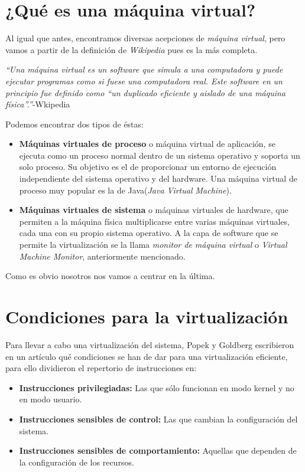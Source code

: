 \section{¿Qué es una máquina virtual?}

\noindent Al igual que antes, encontramos diversas acepciones de \emph{máquina virtual}, pero vamos a partir de la definición de \emph{Wikipedia} pues es la más completa.

\begin{center}
\emph{\textquotedblleft Una máquina virtual es un software que simula a una computadora y puede ejecutar programas como si fuese una computadora real. Este software en un principio fue definido como \textquotedblleft un duplicado eficiente y aislado de una máquina física\textquotedblright.\textquotedblright}-Wkipedia\cite{defmaqvirwiki}
\end{center}

\noindent Podemos encontrar dos tipos de éstas:

\begin{itemize}
\item \textbf{Máquinas virtuales de proceso} o máquina virtual de aplicación, se ejecuta como un proceso normal dentro de un sistema operativo y soporta un solo proceso. Su objetivo es el de proporcionar un entorno de ejecución independiente del sistema operativo y del hardware. Una máquina virtual de proceso muy popular es la de Java(\emph{Java Virtual Machine}).
\item \textbf{Máquinas virtuales de sistema} o máquinas virtuales de hardware, que permiten a la máquina física multiplicarse entre varias máquinas virtuales, cada una con su propio sistema operativo. A la capa de software que se permite la virtualización se la llama \emph{monitor de máquina virtual} o \emph{Virtual Machine Monitor}, anteriormente mencionado.
\end{itemize}

\noindent Como es obvio nosotros nos vamos a centrar en la última.

\section{Condiciones para la virtualización}

\noindent Para llevar a cabo una virtualización del sistema, Popek y Goldberg escribieron en un artículo\cite{reqvir} qué condiciones se han de dar para una virtualización eficiente, para ello dividieron el repertorio de instrucciones en:
\begin{itemize}
\item \textbf{Instrucciones privilegiadas:} Las que sólo funcionan en modo kernel y no en modo usuario.
\item \textbf{Instrucciones sensibles de control:} Las que cambian la configuración del sistema.
\item \textbf{Instrucciones sensibles de comportamiento:} Aquellas que dependen de la configuración de los recursos. 
\end{itemize}

